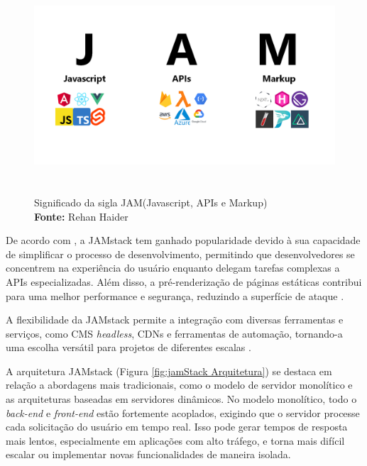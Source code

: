 {    \begin{figure}[H]
        \centering
        \includegraphics[height=8cm, keepaspectratio]{img/arquitetura/sigla JAM stack.png}
        \caption{ Significado da sigla JAM(Javascript, APIs e Markup)
     \\
            \textbf{Fonte:} Rehan Haider}
        \label{fig:jamStack sigla}
    \end{figure}
    De acordo com \cite{smashingmagazine}, a JAMstack tem ganhado popularidade devido à sua capacidade de simplificar o processo de desenvolvimento, permitindo que desenvolvedores se concentrem na experiência do usuário enquanto delegam tarefas complexas a APIs especializadas. Além disso, a pré-renderização de páginas estáticas contribui para uma melhor performance e segurança, reduzindo a superfície de ataque \citep{jamstackbook}.
    
    A flexibilidade da JAMstack permite a integração com diversas ferramentas e serviços, como CMS \textit{headless}, CDNs e ferramentas de automação, tornando-a uma escolha versátil para projetos de diferentes escalas \citep{netlifyjamstack}.
    
    A arquitetura JAMstack (Figura \ref{fig:jamStack Arquitetura}) se destaca em relação a abordagens mais tradicionais, como o modelo de servidor monolítico e as arquiteturas baseadas em servidores dinâmicos. No modelo monolítico, todo o \textit{back-end} e \textit{front-end} estão fortemente acoplados, exigindo que o servidor processe cada solicitação do usuário em tempo real. Isso pode gerar tempos de resposta mais lentos, especialmente em aplicações com alto tráfego, e torna mais difícil escalar ou implementar novas funcionalidades de maneira isolada.
    
}
